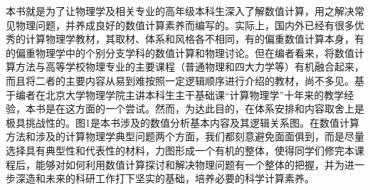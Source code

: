 本书就是为了让物理学及相关专业的高年级本科生深入了解数值计算，用之解决常见物理问题，并养成良好的数值计算素养而编写的。实际上，国内外已经有很多优秀的计算物理学教材，其取材、体系和风格各不相同，有的偏重数值计算本身，有的偏重物理学中的个别分支学科的数值计算和物理讨论。但在编者看来，将数值计算方法与高等学校物理专业的主要课程（普通物理和四大力学等）有机融合起来，而且将二者的主要内容从易到难按照一定逻辑顺序进行介绍的教材，尚不多见。基于编者在北京大学物理学院主讲本科生主干基础课“计算物理学”十年来的教学经验，本书是在这方面的一个尝试。然而，为达此目的，在体系安排和内容取舍上是极具挑战性的。图1是本书涉及的数值分析基本内容及其逻辑关系图。在数值计算方法和涉及的计算物理学典型问题两个方面，我们都刻意避免面面俱到，而是尽量选择具有典型性和代表性的材料，力图形成一个有机的整体，使得同学们修完本课程后，能够对如何利用数值计算探讨和解决物理问题有一个整体的把握，并为进一步深造和未来的科研工作打下坚实的基础，培养必要的科学计算素养。

